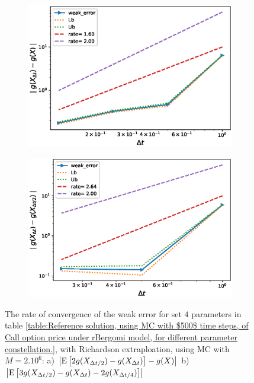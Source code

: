 \documentclass[11pt]{article}
\newcommand{\expt}[1]{\mathrm{E}\left[#1\right]}
\begin{document}
\begin{figure}[!htbp]
	\centering
	\begin{subfigure}{.4\textwidth}
		\centering
		\includegraphics[width=1\linewidth]{./figures/rBergomi_weak_error_rates/with_richardson/H_007/weak_convergence_order_Bergomi_H_007_K_12_M_2_10_6_richardson_relative}
		\caption{}
		\label{fig:sub3}
	\end{subfigure}%
	\begin{subfigure}{.4\textwidth}
		\centering
		\includegraphics[width=1\linewidth]{./figures/rBergomi_weak_error_rates/with_richardson/H_007/weak_convergence_order_differences_Bergomi_H_007_K_12_M_2_10_6_richardson_relative}
		\caption{}
		\label{fig:sub4}
	\end{subfigure}
	
	\caption{The rate of convergence of the weak error for set $4$ parameters in table \ref{table:Reference solution, using MC with $500$ time steps, of Call option price under rBergomi model, for different parameter constellation.}, with Richardson extraploation, using MC with $M=2.10^6$: a) $\abs{\expt{2 g(X_{\Delta t/2}) -g(X_{\Delta t})}-g(X)}$  b) $\abs{\expt{3 g(X_{\Delta t/2})-g(X_{\Delta t})-2 g(X_{\Delta t/4})}}$ }
	\label{fig:Weak_rate_H_007_with_rich_K12}
\end{figure}
\FloatBarrier
\end{document}
